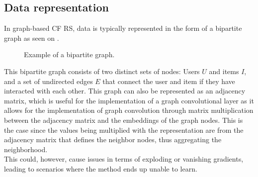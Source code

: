 \subsection{Data representation}
In graph-based CF RS, data is typically represented in the form of a bipartite graph as seen on .
\begin{figure}[h]
\caption{Example of a bipartite graph.}
\label{fig:bipartite-graph}
\end{figure}
This bipartite graph consists of two distinct sets of nodes: Users $U$ and items $I$, and a set of undirected edges $E$ that connect the user and item if they have interacted with each other.
This graph can also be represented as an adjacency matrix, which is useful for the implementation of a graph convolutional layer as it allows for the implementation of graph convolution through matrix multiplication between the adjacency matrix and the embeddings of the graph nodes.
This is the case since the values being multiplied with the representation are from the adjacency matrix that defines the neighbor nodes, thus aggregating the neighborhood.\\
This could, however, cause issues in terms of exploding or vanishing gradients, leading to scenarios where the method ends up unable to learn.
